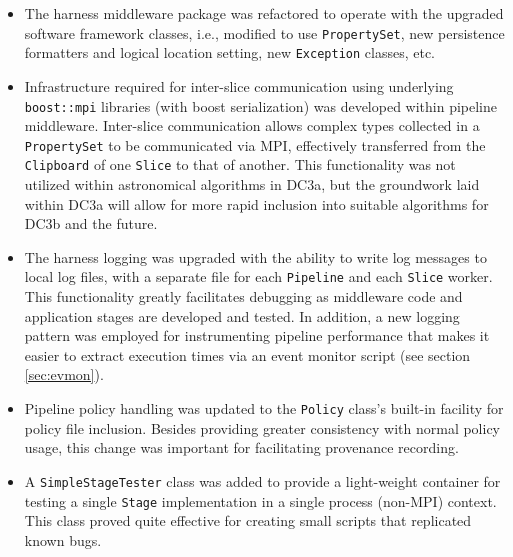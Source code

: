 \begin{itemize}
\item The harness middleware package was refactored to operate with
the upgraded software framework classes, i.e., modified to use 
{\tt PropertySet}, new persistence formatters and logical location setting,
new {\tt Exception} classes, etc.
\item Infrastructure required for inter-slice communication using
underlying {\tt boost::mpi} libraries (with boost serialization) was
developed within pipeline middleware.  Inter-slice communication
allows complex types collected in a {\tt PropertySet} to be
communicated via MPI, effectively transferred from the {\tt Clipboard}
of one {\tt Slice} to that of another.  This functionality was not
utilized within astronomical algorithms in DC3a, but the
groundwork laid within DC3a will allow for more rapid inclusion into
suitable algorithms for DC3b and the future.
\item The harness logging was upgraded with the ability to write log
messages to local log files, with a separate file for each {\tt Pipeline}
and each {\tt Slice} worker.  This functionality greatly facilitates
debugging as middleware code and application stages are developed and
tested.  In addition, a new logging pattern was employed for
instrumenting pipeline performance that makes it easier to extract
execution times via an event monitor script (see
section \ref{sec:evmon}).  
\item Pipeline policy handling was updated to the {\tt Policy} class's
built-in facility for policy file inclusion.  Besides providing
greater consistency with normal policy usage, this change was
important for facilitating provenance recording.  
\item A {\tt SimpleStageTester} class was added to provide a
light-weight container for testing a single {\tt Stage} implementation
in a single process (non-MPI) context.  This class proved quite
effective for creating small scripts that replicated known bugs.  
\end{itemize}

